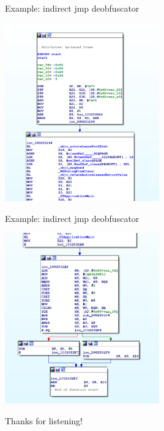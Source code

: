 \documentclass[10pt, compress, aspectratio=169]{beamer}
\begin{document}
\begin{frame}{Example: indirect jmp deobfuscator}
\begin{center}
  \includegraphics[width=0.5\textwidth]{images/deobf-2-ida2.png}
   \end{center}
\end{frame}

\begin{frame}{Example: indirect jmp deobfuscator}
\begin{center}
  \includegraphics[width=0.5\textwidth]{images/deobf-3-ida3.png}
   \end{center}
\end{frame}

\begin{frame}[standout]
Thanks for listening!
\end{frame}
\end{document}
